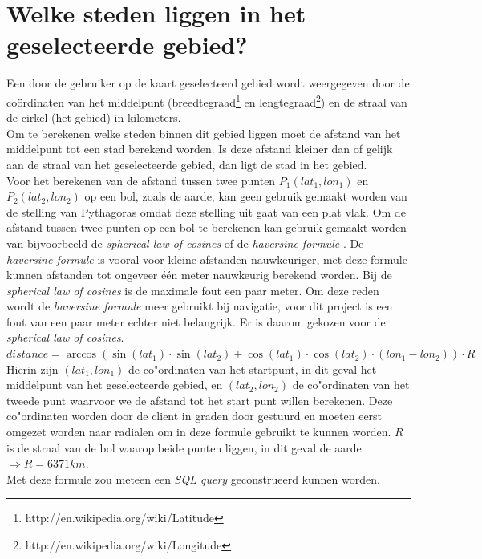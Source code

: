 \documentclass[twoside,openright]{uva-bachelor-thesis}
\begin{document}
	\section{Welke steden liggen in het geselecteerde gebied?}
		Een door de gebruiker op de kaart geselecteerd gebied wordt weergegeven door de co\"ordinaten van het middelpunt (breedtegraad\footnote{http://en.wikipedia.org/wiki/Latitude} en lengtegraad\footnote{http://en.wikipedia.org/wiki/Longitude}) en de straal van de cirkel (het gebied) in kilometers.
		\\[0.5cm]
		Om te berekenen welke steden binnen dit gebied liggen moet de afstand van het middelpunt tot een stad berekend worden. Is deze afstand kleiner dan of gelijk aan de straal van het geselecteerde gebied, dan ligt de stad in het gebied.
		\\[0.5cm]
		Voor het berekenen van de afstand tussen twee punten $P_1(lat_1, lon_1)$ en $P_2(lat_2, lon_2)$ op een bol, zoals de aarde,  kan geen gebruik gemaakt worden van de stelling van Pythagoras \cite{Pytha} omdat deze stelling uit gaat van een plat vlak. Om de afstand tussen twee punten op een bol te berekenen kan gebruik gemaakt worden van bijvoorbeeld de \textit{spherical law of cosines} \cite{spherical} of de \textit{haversine formule} \cite{haversine}. De \textit{haversine formule} is vooral voor kleine afstanden nauwkeuriger, met deze formule kunnen afstanden tot ongeveer \'e\'en meter nauwkeurig berekend worden. Bij de \textit{spherical law of cosines} is de maximale fout een paar meter. Om deze reden wordt de \textit{haversine formule} meer gebruikt bij navigatie, voor dit project is een fout van een paar meter echter niet belangrijk. Er is daarom gekozen voor de \textit{spherical law of cosines}.
		\\[0.5cm]
		$distance = \arccos(\sin(lat_1) \cdot \sin(lat_2) + \cos(lat_1) \cdot \cos(lat_2) \cdot(lon_1 - lon_2)) \cdot R$
		\\[0.5cm]
		Hierin zijn $(lat_1, lon_1)$ de co"ordinaten van het startpunt, in dit geval het middelpunt van het geselecteerde gebied, en $(lat_2, lon_2)$ de co"ordinaten van het tweede punt waarvoor we de afstand tot het start punt willen berekenen. Deze co"ordinaten worden door de client in graden door gestuurd en moeten eerst omgezet worden naar radialen om in deze formule gebruikt te kunnen worden. $R$ is de straal van de bol waarop beide punten liggen, in dit geval de aarde $ 	\Rightarrow R = 6371km$.
		\\[0.5cm]
		Met deze formule zou meteen een \textit{SQL \cite{SQL} query} geconstrueerd kunnen worden.
\end{document}
